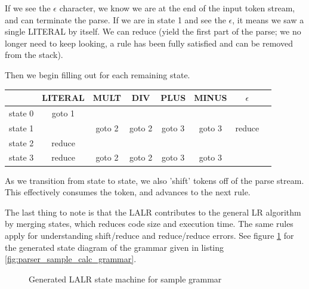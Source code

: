 \documentclass[]{article}
\begin{document}
If we see the $\epsilon$ character, we know we are at the end of the input token stream, and can terminate the parse.
If we are in state 1 and see the $\epsilon$, it means we saw a single LITERAL by itself.
We can reduce (yield the first part of the parse; we no longer need to keep looking, a rule has been fully satisfied and can be removed from the stack).

Then we begin filling out for each remaining state.

\begin{center}
	\begin{tabular}{| c | c | c | c | c | c | c | c |}
		\hline
		& LITERAL      & MULT & DIV & PLUS & MINUS & $\epsilon$ \\
		\hline
		state 0 & goto 1 & & & & & \\
		state 1 &  & goto 2 & goto 2 & goto 3 & goto 3 & reduce \\
		state 2 & reduce & & & & & \\
		state 3 & reduce & goto 2 & goto 2 & goto 3 & goto 3 & \\
		\hline
	\end{tabular}
\end{center}

As we transition from state to state, we also 'shift' tokens off of the parse stream.
This effectively consumes the token, and advances to the next rule.

The last thing to note is that the LALR contributes to the general LR algorithm by merging states, which reduces code size and execution time.
The same rules apply for understanding shift/reduce and reduce/reduce errors.
See figure \ref{fig:parser_generated_graph} for the generated state diagram of the grammar given in listing \ref{fig:parser_sample_calc_grammar}.

\begin{figure}
	\begin{center}
	\end{center}
	\label{fig:parser_generated_graph}
	\caption{Generated LALR state machine for sample grammar}
\end{figure}
\end{document}
